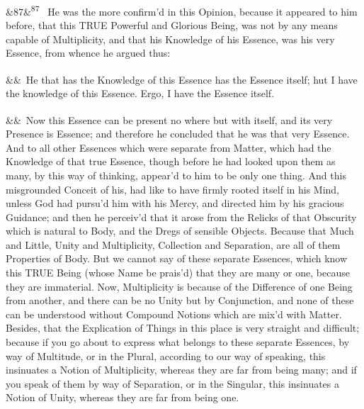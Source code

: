 \documentclass[12pt]{article}
\newcommand{\para}[1][]{\par\noindent\ifx&#1&\else\textsuperscript{\footnotesize #1}~\fi}
\begin{document}
\para[87] He was the more confirm'd in this Opinion, because it appeared to him before, that this TRUE Powerful and Glorious Being, was not by any means capable of Multiplicity, and that his Knowledge of his Essence, was his very Essence, from whence he argued thus:

\para He that has the Knowledge of this Essence has the Essence itself; hut I have the knowledge of this Essence. Ergo, I have the Essence itself.

\para Now this Essence can be present no where but with itself, and its very Presence is Essence; and therefore he concluded that he was that very Essence. And to all other Essences which were separate from Matter, which had the Knowledge of that true Essence, though before he had looked upon them as many, by this way of thinking, appear'd to him to be only one thing. And this misgrounded Conceit of his, had like to have firmly rooted itself in his Mind, unless God had pursu'd him with his Mercy, and directed him by his gracious Guidance; and then he perceiv'd that it arose from the Relicks of that Obscurity which is natural to Body, and the Dregs of sensible Objects. Because that Much and Little, Unity and Multiplicity, Collection and Separation, are all of them Properties of Body. But we cannot say of these separate Essences, which know this TRUE Being (whose Name be prais'd) that they are many or one, because they are immaterial. Now, Multiplicity is because of the Difference of one Being from another, and there can be no Unity but by Conjunction, and none of these can be understood without Compound Notions which are mix'd with Matter. Besides, that the Explication of Things in this place is very straight and difficult; because if you go about to express what belongs to these separate Essences, by way of Multitude, or in the Plural, according to our way of speaking, this insinuates a Notion of Multiplicity, whereas they are far from being many; and if you speak of them by way of Separation, or in the Singular, this insinuates a Notion of Unity, whereas they are far from being one.
\end{document}
